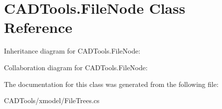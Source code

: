\hypertarget{class_c_a_d_tools_1_1_file_node}{}\section{C\+A\+D\+Tools.\+File\+Node Class Reference}
\label{class_c_a_d_tools_1_1_file_node}


Inheritance diagram for C\+A\+D\+Tools.\+File\+Node\+:


Collaboration diagram for C\+A\+D\+Tools.\+File\+Node\+:


The documentation for this class was generated from the following file\+:\begin{DoxyCompactItemize}
\item 
C\+A\+D\+Tools/xmodel/File\+Trees.\+cs\end{DoxyCompactItemize}
